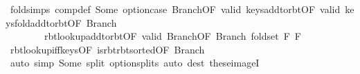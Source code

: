 \begin{isabellebody}
\ fold{\isacharunderscore}{\kern0pt}simps\ comp{\isacharunderscore}{\kern0pt}def\ Some\ option{\isachardot}{\kern0pt}case{\isacharparenleft}{\kern0pt}{}{\isacharparenright}{\kern0pt}\ Branch{\isacharparenleft}{\kern0pt}{}{\isacharparenright}{\kern0pt}{\isacharbrackleft}{\kern0pt}OF\ valid{\isacharprime}{\kern0pt}{\isacharbrackright}{\kern0pt}\ keys{\isacharunderscore}{\kern0pt}add{\isacharunderscore}{\kern0pt}to{\isacharunderscore}{\kern0pt}rbt{\isacharbrackleft}{\kern0pt}OF\ valid{\isacharbrackright}{\kern0pt}\ keys{\isacharunderscore}{\kern0pt}fold{\isacharunderscore}{\kern0pt}add{\isacharunderscore}{\kern0pt}to{\isacharunderscore}{\kern0pt}rbt{\isacharbrackleft}{\kern0pt}OF\ Branch{\isacharparenleft}{\kern0pt}{}{\isacharparenright}{\kern0pt}{\isacharbrackright}{\kern0pt}\isanewline
\ \ \ \ \ \ \ \ rbt{\isacharunderscore}{\kern0pt}lookup{\isacharunderscore}{\kern0pt}add{\isacharunderscore}{\kern0pt}to{\isacharunderscore}{\kern0pt}rbt{\isacharbrackleft}{\kern0pt}OF\ valid{\isacharbrackright}{\kern0pt}\ Branch{\isacharparenleft}{\kern0pt}{}{\isacharparenright}{\kern0pt}{\isacharbrackleft}{\kern0pt}OF\ Branch{\isacharparenleft}{\kern0pt}{}{\isacharparenright}{\kern0pt}{\isacharbrackright}{\kern0pt}\ fold{\isacharunderscore}{\kern0pt}set\ F{}\ F{}\isanewline
\ \ \ \ \ \ \isamarkupfalse%
\ rbt{\isacharunderscore}{\kern0pt}lookup{\isacharunderscore}{\kern0pt}iff{\isacharunderscore}{\kern0pt}keys{\isacharparenleft}{\kern0pt}{}{\isacharcomma}{\kern0pt}{}{\isacharparenright}{\kern0pt}{\isacharbrackleft}{\kern0pt}OF\ is{\isacharunderscore}{\kern0pt}rbt{\isacharunderscore}{\kern0pt}rbt{\isacharunderscore}{\kern0pt}sorted{\isacharbrackleft}{\kern0pt}OF\ Branch{\isacharparenleft}{\kern0pt}{}{\isacharparenright}{\kern0pt}{\isacharbrackright}{\kern0pt}{\isacharbrackright}{\kern0pt}\isanewline
\ \ \ \ \ \ \isamarkupfalse%
\ {\isacharparenleft}{\kern0pt}auto\ simp{\isacharcolon}{\kern0pt}\ Some\ split{\isacharcolon}{\kern0pt}\ option{\isachardot}{\kern0pt}splits{\isacharparenright}{\kern0pt}\ {\isacharparenleft}{\kern0pt}auto\ dest{\isacharcolon}{\kern0pt}\ these{\isacharunderscore}{\kern0pt}imageI{\isacharparenright}{\kern0pt}\ \isanewline
\ \ \isamarkupfalse%
\isanewline
{}\isamarkupfalse%
%
\endisatagproof
{\isafoldproof}%
%
\isadelimproof
\isanewline
%
\endisadelimproof
\isanewline
{}\isamarkupfalse%
\isanewline
\isanewline
{}\isamarkupfalse%
\isanewline

\end{isabellebody}
